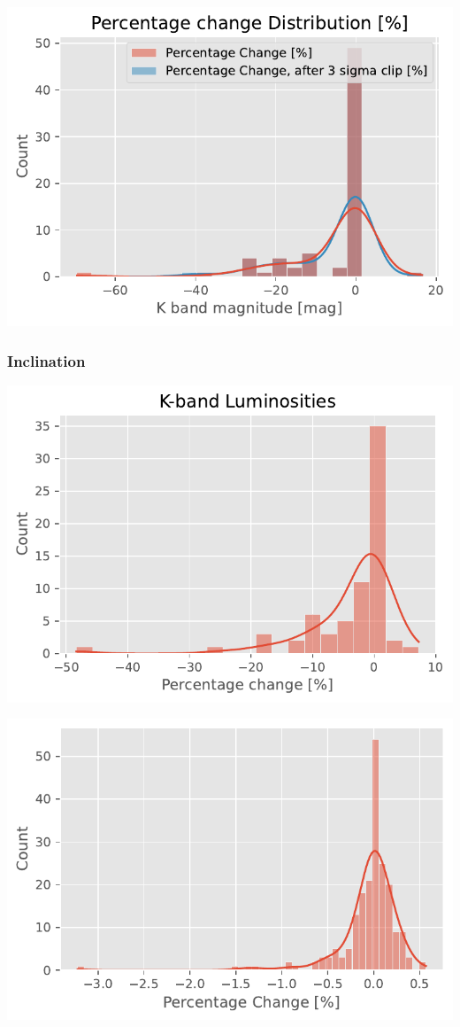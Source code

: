 \documentclass[
]{article}
\begin{document}
\includegraphics{compare_files/figure-pdf/cell-27-output-1.pdf}

\subsubsection{Inclination}

\includegraphics{compare_files/figure-pdf/cell-28-output-1.pdf}

\includegraphics{compare_files/figure-pdf/cell-28-output-2.pdf}
\end{document}
